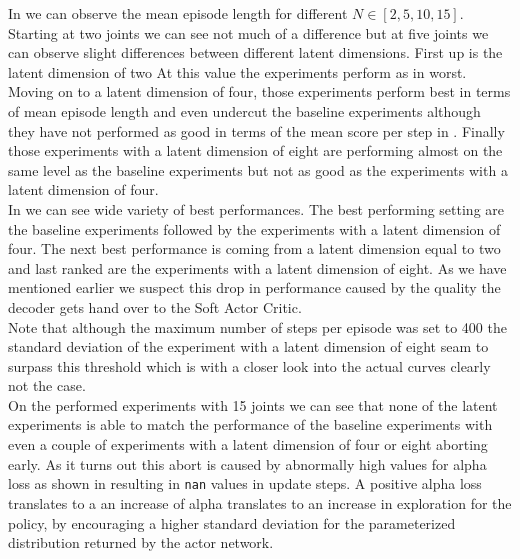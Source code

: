 In  we can observe the mean episode length for different $N \in [2, 5, 10, 15]$. Starting at two joints we can see not much of a difference but at five joints we can observe slight differences between different latent dimensions. First up is the latent dimension of two At this value the experiments perform as in  worst.\\
Moving on to a latent dimension of four, those experiments perform best in terms of mean episode length and even undercut the baseline experiments although they have not performed as good in terms of the mean score per step in . Finally those experiments with a latent dimension of eight are performing almost on the same level as the baseline experiments but not as good as the experiments with a latent dimension of four. \\
In  we can see wide variety of best performances. The best performing setting are the baseline experiments followed by the experiments with a latent dimension of four. The next best performance is coming from a latent dimension equal to two and last ranked are the experiments with a latent dimension of eight. As we have mentioned earlier we suspect this drop in performance caused by the quality the decoder gets hand over to the Soft Actor Critic. \\
Note that although the maximum number of steps per episode was set to 400 the standard deviation of the experiment with a latent dimension of eight seam to surpass this threshold which is with a closer look into the actual curves clearly not the case. \\ 
On the performed experiments with 15 joints we can see that none of the latent experiments is able to match the performance of the baseline experiments with even a couple of experiments with a latent dimension of four or eight aborting early. As it turns out this abort is caused by abnormally high values for alpha loss as shown in  resulting in \texttt{nan} values in update steps. A positive alpha loss translates to a an increase of alpha translates to an increase in exploration for the policy, by encouraging a higher standard deviation for the parameterized distribution returned by the actor network.
